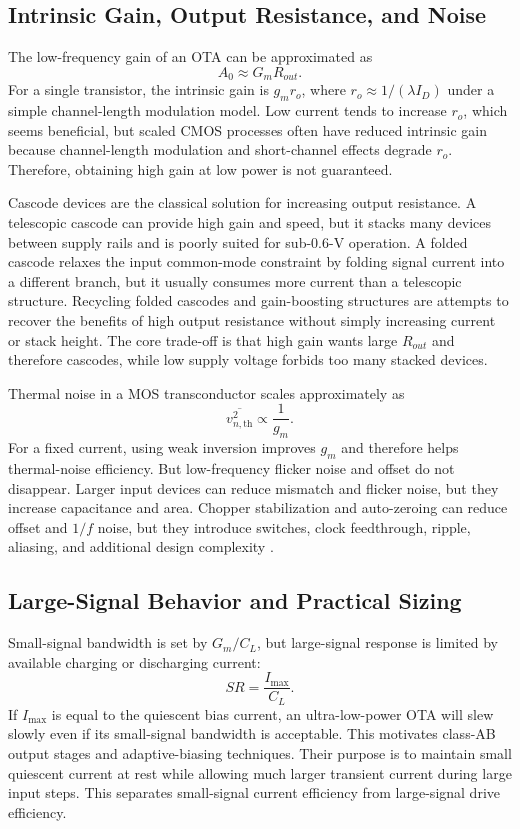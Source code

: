 \documentclass[conference,a4paper]{IEEEtran}
\begin{document}
\subsection{Intrinsic Gain, Output Resistance, and Noise}
The low-frequency gain of an OTA can be approximated as
\begin{equation}
  A_0 \approx G_mR_{out}.
\end{equation}
For a single transistor, the intrinsic gain is $g_mr_o$, where $r_o\approx 1/(\lambda I_D)$ under a simple channel-length modulation model. Low current tends to increase $r_o$, which seems beneficial, but scaled CMOS processes often have reduced intrinsic gain because channel-length modulation and short-channel effects degrade $r_o$. Therefore, obtaining high gain at low power is not guaranteed.

Cascode devices are the classical solution for increasing output resistance. A telescopic cascode can provide high gain and speed, but it stacks many devices between supply rails and is poorly suited for sub-0.6-V operation. A folded cascode relaxes the input common-mode constraint by folding signal current into a different branch, but it usually consumes more current than a telescopic structure. Recycling folded cascodes and gain-boosting structures are attempts to recover the benefits of high output resistance without simply increasing current or stack height. The core trade-off is that high gain wants large $R_{out}$ and therefore cascodes, while low supply voltage forbids too many stacked devices.

Thermal noise in a MOS transconductor scales approximately as
\begin{equation}
  \overline{v_{n,\mathrm{th}}^2}\propto\frac{1}{g_m}.
\end{equation}
For a fixed current, using weak inversion improves $g_m$ and therefore helps thermal-noise efficiency. But low-frequency flicker noise and offset do not disappear. Larger input devices can reduce mismatch and flicker noise, but they increase capacitance and area. Chopper stabilization and auto-zeroing can reduce offset and $1/f$ noise, but they introduce switches, clock feedthrough, ripple, aliasing, and additional design complexity \cite{enz1996offset}.

\subsection{Large-Signal Behavior and Practical Sizing}
Small-signal bandwidth is set by $G_m/C_L$, but large-signal response is limited by available charging or discharging current:
\begin{equation}
  SR=\frac{I_{\max}}{C_L}.
\end{equation}
If $I_{\max}$ is equal to the quiescent bias current, an ultra-low-power OTA will slew slowly even if its small-signal bandwidth is acceptable. This motivates class-AB output stages and adaptive-biasing techniques. Their purpose is to maintain small quiescent current at rest while allowing much larger transient current during large input steps. This separates small-signal current efficiency from large-signal drive efficiency.
\end{document}
